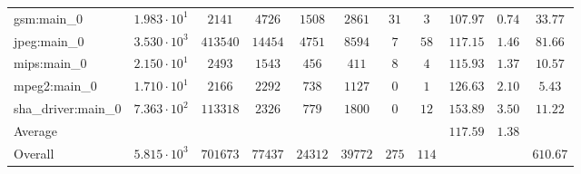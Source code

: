 \begin{tabular}{|l|c|c|c|c|c|c|c|c|c|c|}
gsm:main\_0             & $ 1.983 \cdot 10^{1}  $ & $ 2141   $ & $ 4726  $ & $ 1508  $ & $ 2861  $ & $ 31  $ & $ 3   $ & $ 107.97      $ & $ 0.74    $ & $ 33.77   $ \\
jpeg:main\_0            & $ 3.530 \cdot 10^{3}  $ & $ 413540 $ & $ 14454 $ & $ 4751  $ & $ 8594  $ & $ 7   $ & $ 58  $ & $ 117.15      $ & $ 1.46    $ & $ 81.66   $ \\
mips:main\_0            & $ 2.150 \cdot 10^{1}  $ & $ 2493   $ & $ 1543  $ & $ 456   $ & $ 411   $ & $ 8   $ & $ 4   $ & $ 115.93      $ & $ 1.37    $ & $ 10.57   $ \\
mpeg2:main\_0           & $ 1.710 \cdot 10^{1}  $ & $ 2166   $ & $ 2292  $ & $ 738   $ & $ 1127  $ & $ 0   $ & $ 1   $ & $ 126.63      $ & $ 2.10    $ & $ 5.43    $ \\
sha\_driver:main\_0     & $ 7.363 \cdot 10^{2}  $ & $ 113318 $ & $ 2326  $ & $ 779   $ & $ 1800  $ & $ 0   $ & $ 12  $ & $ 153.89      $ & $ 3.50    $ & $ 11.22   $ \\
\hline
Average                 & $                     $ & $        $ & $       $ & $       $ & $       $ & $     $ & $     $ & $ 117.59      $ & $ 1.38    $ & $         $ \\
\hline
Overall                 & $ 5.815 \cdot 10^{3}  $ & $ 701673 $ & $ 77437 $ & $ 24312 $ & $ 39772 $ & $ 275 $ & $ 114 $ & $             $ & $         $ & $ 610.67  $ \\
\hline
\end{tabular}
